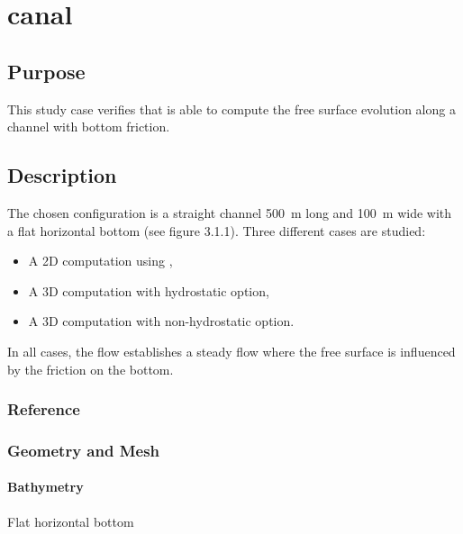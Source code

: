 \chapter{canal}
%
%
\section{Purpose}
%
This study case verifies that  is able to compute the free
surface evolution along a channel with bottom friction.
%
\section{Description}
%
The chosen configuration is a straight channel 500~m long and 100~m wide
with a flat horizontal bottom (see figure 3.1.1).
Three different cases are studied:
\begin{itemize}
\item A 2D computation using ,
\item A 3D computation with hydrostatic option,
\item A 3D computation with non-hydrostatic option.
\end{itemize}
In all cases, the flow establishes a steady flow where the free surface
is influenced by the friction on the bottom.
%
%
%
%
\subsection{Reference}
%

%
%
%
\subsection{Geometry and Mesh}
%
\subsubsection{Bathymetry}
%
Flat horizontal bottom
%
